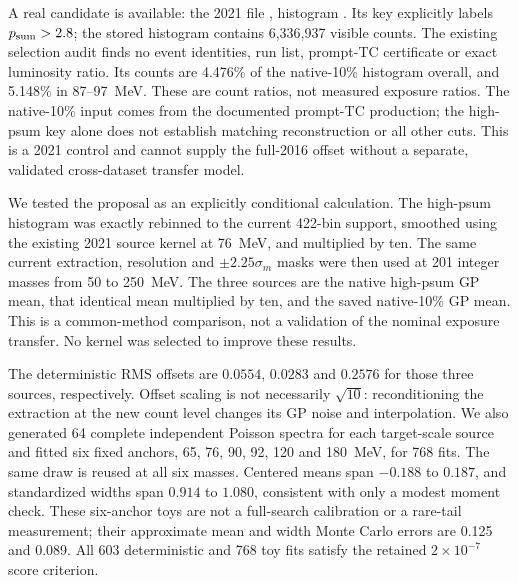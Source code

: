 \label{sec:physics-onepercent}
A real candidate is available: the 2021 file , histogram . Its key explicitly labels $p_{\rm sum}>2.8$; the stored histogram contains 6,336,937 visible counts. The existing selection audit finds no event identities, run list, prompt-TC certificate or exact luminosity ratio. Its counts are 4.476\% of the native-10\% histogram overall, and 5.148\% in 87--97~MeV. These are count ratios, not measured exposure ratios. The native-10\% input comes from the documented prompt-TC production; the high-psum key alone does not establish matching reconstruction or all other cuts. This is a 2021 control and cannot supply the full-2016 offset without a separate, validated cross-dataset transfer model.

We tested the proposal as an explicitly conditional calculation. The high-psum histogram was exactly rebinned to the current 422-bin support, smoothed using the existing 2021 source kernel at 76~MeV, and multiplied by ten. The same current extraction, resolution and $\pm2.25\sigma_m$ masks were then used at 201 integer masses from 50 to 250~MeV. The three sources are the native high-psum GP mean, that identical mean multiplied by ten, and the saved native-10\% GP mean. This is a common-method comparison, not a validation of the nominal exposure transfer. No kernel was selected to improve these results.


The deterministic RMS offsets are $0.0554$, $0.0283$ and $0.2576$ for those three sources, respectively. Offset scaling is not necessarily $\sqrt{10}$: reconditioning the extraction at the new count level changes its GP noise and interpolation. We also generated 64 complete independent Poisson spectra for each target-scale source and fitted six fixed anchors, 65, 76, 90, 92, 120 and 180~MeV, for 768 fits. The same draw is reused at all six masses. Centered means span $-0.188$ to $0.187$, and standardized widths span $0.914$ to $1.080$, consistent with only a modest moment check. These six-anchor toys are not a full-search calibration or a rare-tail measurement; their approximate mean and width Monte Carlo errors are 0.125 and 0.089. All 603 deterministic and 768 toy fits satisfy the retained $2\times10^{-7}$ score criterion.

